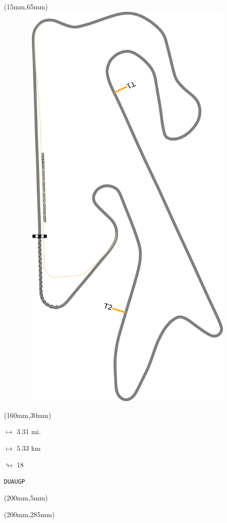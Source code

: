 \begin{textblock*}{185mm}(15mm,65mm)%
\centering
\mbox{\includegraphics[width=185mm,height=210mm,keepaspectratio]{PT/DUAUGP.pdf}}
\end{textblock*}
\begin{textblock*}{40mm}(160mm,30mm)%
\Large
\par$\mapsto$ 3.31 mi.
\par$\mapsto$ 5.33 km
\par$\looparrowright$ 18
\par\hfill\tiny\tt DUAUGP\\
\end{textblock*}
\begin{textblock*}{20mm}(200mm,5mm)%
\fbox{\thepage}
\label{DUAUGP}
\end{textblock*}
\begin{textblock*}{20mm}(200mm,285mm)%
\fbox{\thepage}
\end{textblock*}

